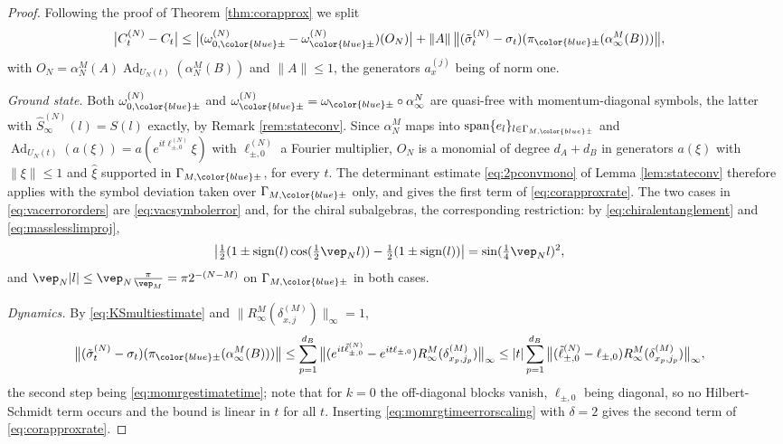 \documentclass[a4paper, 11pt]{article}
\DeclareMathOperator{\Ad}{Ad}
\DeclareMathOperator{\1}{\mathds{1}}
\DeclareMathOperator{\sign}{\textup{sign}}
\begin{document}
\begin{proof}
Following the proof of Theorem \ref{thm:corapprox} we split
\begin{align*}
\big|C^{(N)}_{t}-C_{t}\big| & \leq \big|(\omega^{(N)}_{0,{\color{blue}\pm}}-\omega^{(N)}_{{\color{blue}\pm}})(O_{N})\big| + \|A\|\!\ \big\|(\tilde{\sigma}^{(N)}_{t}-\sigma_{t})(\pi_{{\color{blue}\pm}}(\alpha^{M}_{\infty}(B)))\big\|,
\end{align*}
with $O_{N}=\alpha^{M}_{N}(A)\Ad_{U_{N}(t)}(\alpha^{M}_{N}(B))$ and $\|A\|\leq1$, the generators $a^{(j)}_{x}$ being of norm one.

\emph{Ground state.} Both $\omega^{(N)}_{0,{\color{blue}\pm}}$ and $\omega^{(N)}_{{\color{blue}\pm}}=\omega_{{\color{blue}\pm}}\circ\alpha^{N}_{\infty}$ are quasi-free with momentum-diagonal symbols, the latter with $\hat{S}^{(N)}_{\infty}(l)=S(l)$ exactly, by Remark \ref{rem:stateconv}. Since $\alpha^{M}_{N}$ maps into $\operatorname{span}\{e_{l}\}_{l\in\Gamma_{M,{\color{blue}\pm}}}$ and $\Ad_{U_{N}(t)}(a(\xi))=a(e^{it\ell^{(N)}_{\pm,0}}\xi)$ with $\ell^{(N)}_{\pm,0}$ a Fourier multiplier, $O_{N}$ is a monomial of degree $d_{A}+d_{B}$ in generators $a(\xi)$ with $\|\xi\|\leq1$ and $\hat{\xi}$ supported in $\Gamma_{M,{\color{blue}\pm}}$, for every $t$. The determinant estimate \eqref{eq:2pconvmono} of Lemma \ref{lem:stateconv} therefore applies with the symbol deviation taken over $\Gamma_{M,{\color{blue}\pm}}$ only, and gives the first term of \eqref{eq:corapproxrate}. The two cases in \eqref{eq:vacerrororders} are \eqref{eq:vacsymbolerror} and, for the chiral subalgebras, the corresponding restriction: by \eqref{eq:chiralentanglement} and \eqref{eq:masslesslimproj},
\begin{align*}
\big|\tfrac{1}{2}(1\pm\sign(l)\cos(\tfrac{1}{2}\vep_{N}l))-\tfrac{1}{2}(1\pm\sign(l))\big| & = \sin(\tfrac{1}{4}\vep_{N}l)^{2},
\end{align*}
and $\vep_{N}|l|\leq\vep_{N}\tfrac{\pi}{\vep_{M}}=\pi2^{-(N-M)}$ on $\Gamma_{M,{\color{blue}\pm}}$ in both cases.

\emph{Dynamics.} By \eqref{eq:KSmultiestimate} and $\|R^{M}_{\infty}(\delta^{(M)}_{x,j})\|_{\infty}=1$,
\begin{align*}
\big\|(\tilde{\sigma}^{(N)}_{t}-\sigma_{t})(\pi_{{\color{blue}\pm}}(\alpha^{M}_{\infty}(B)))\big\| & \leq \sum_{p=1}^{d_{B}}\big\|(e^{it\tilde{\ell}^{(N)}_{\pm,0}}-e^{it\ell_{\pm,0}})R^{M}_{\infty}(\delta^{(M)}_{x_{p},j_{p}})\big\|_{\infty} \leq |t|\sum_{p=1}^{d_{B}}\big\|(\tilde{\ell}^{(N)}_{\pm,0}-\ell_{\pm,0})R^{M}_{\infty}(\delta^{(M)}_{x_{p},j_{p}})\big\|_{\infty},
\end{align*}
the second step being \eqref{eq:momrgestimatetime}; note that for $k=0$ the off-diagonal blocks vanish, $\ell_{\pm,0}$ being diagonal, so no Hilbert-Schmidt term occurs and the bound is linear in $t$ for all $t$. Inserting \eqref{eq:momrgtimeerrorscaling} with $\delta=2$ gives the second term of \eqref{eq:corapproxrate}.
\end{proof}
\end{document}
